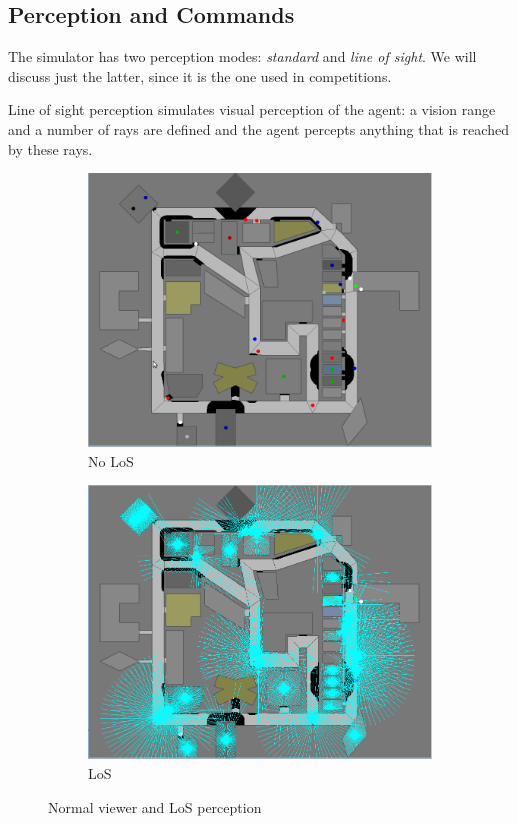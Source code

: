 \documentclass{article}
\begin{document}
\subsection{Perception and Commands}
The simulator has two perception modes: \emph{standard} and \emph{line of sight}. We will discuss just the latter, since it is the one used in competitions.

Line of sight perception simulates visual perception of the agent: a vision range and a number of rays are defined and the agent percepts anything that is reached by these rays.
\begin{figure}[htp]
  \centering
  \begin{subfigure}[hb]{0.45\textwidth}
    \centering
    \includegraphics[width=\textwidth]{figs/no_los}
    \caption{No LoS}
    \label{fig:los_a}
  \end{subfigure}
  \begin{subfigure}[hb]{0.45\textwidth}
    \centering
    \includegraphics[width=\textwidth]{figs/with_los}
    \caption{LoS}
    \label{fig:los_b}
  \end{subfigure}
  \caption{Normal viewer and LoS perception}
  \label{fig:los}
\end{figure}
\end{document}
